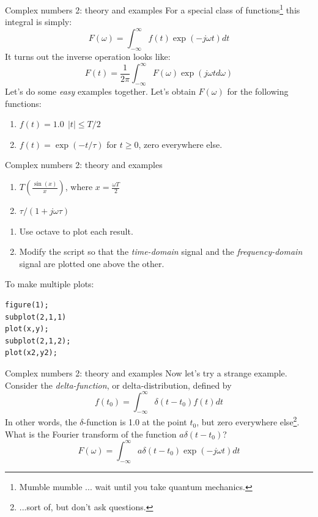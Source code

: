 \documentclass{beamer}
\begin{document}
\begin{frame}[fragile]{Complex numbers 2: theory and examples}
\small
For a special class of functions\footnote{Mumble mumble ... wait until you take quantum mechanics.} this integral is simply:
\begin{equation}
\boxed{
F(\omega) = \int_{-\infty}^{\infty} f(t) \exp(-j\omega t) dt}
\end{equation}
It turns out the inverse operation looks like:
\begin{equation}
\boxed{
F(t) = \frac{1}{2\pi} \int_{-\infty}^{\infty} F(\omega) \exp(j\omega t d\omega)}
\end{equation}
Let's do some \textit{easy} examples together.  Let's obtain $F(\omega)$ for the following functions:
\begin{enumerate}
\item $f(t) = 1.0 ~~ |t| \leq T/2$
\item $f(t) = \exp(-t/\tau)$ for $t \geq 0$, zero everywhere else.
\end{enumerate}
\end{frame}

\begin{frame}[fragile]{Complex numbers 2: theory and examples}
\small
\begin{enumerate}
\item $T \left(\frac{\sin(x)}{x}\right)$, where $x = \frac{\omega T}{2}$
\item $\tau/(1+j\omega \tau)$
\end{enumerate}
\begin{enumerate}
\item Use octave to plot each result.
\item Modify the script so that the \textit{time-domain} signal and the \textit{frequency-domain} signal are plotted one above the other.
\end{enumerate}
To make multiple plots:
\begin{verbatim}
figure(1);
subplot(2,1,1)
plot(x,y);
subplot(2,1,2);
plot(x2,y2);
\end{verbatim}
\end{frame}

\begin{frame}[fragile]{Complex numbers 2: theory and examples}
\small
Now let's try a strange example.  Consider the \textit{delta-function}, or delta-distribution, defined by
\begin{equation}
f(t_0) = \int_{-\infty}^{\infty} \delta(t-t_0) f(t) dt
\end{equation}
In other words, the $\delta$-function is 1.0 at the point $t_0$, but zero everywhere else\footnote{...sort of, but don't ask questions.}.  What is the Fourier transform of the function $a\delta(t-t_0)$?
\begin{equation}
F(\omega) = \int_{-\infty}^{\infty} a\delta(t-t_0) \exp(-j\omega t) dt
\end{equation}
\end{frame}
\end{document}
